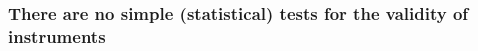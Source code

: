 \documentclass[12pt,reqno,titlepage]{amsart}
\theoremstyle{definition}
\begin{document}
\begin{doublespace}



\subsubsection{There are no simple (statistical) tests for the validity of instruments}


\end{doublespace}
\end{document}
